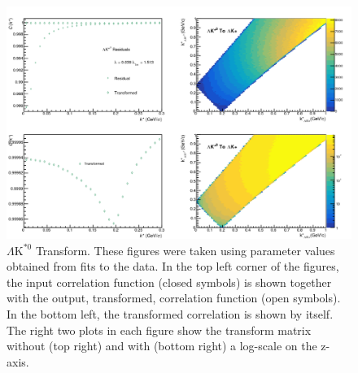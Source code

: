 \documentclass[../AnalysisNoteJBuxton.tex]{subfiles}
\begin{document}
\begin{figure}[h]
  \centering
  \includegraphics[width=\textwidth]{5_Fitting/Figures/Residuals_LamKchP_0010_LamKSt0_MomResCrctn_NonFlatBgdCrctn_10Res_PrimMaxDecay4fm_UsingXiDataAndCoulombOnly.pdf}
  \caption[$\Lambda\mathrm{K^{*0}}$ Transform]{$\Lambda\mathrm{K^{*0}}$ Transform.  These figures were taken using parameter values obtained from fits to the data.  In the top left corner of the figures, the input correlation function (closed symbols) is shown together with the output, transformed, correlation function (open symbols).  In the bottom left, the transformed correlation is shown by itself.  The right two plots in each figure show the transform matrix without (top right) and with (bottom right) a log-scale on the z-axis.}
  \label{fig:LamKSt0toLamKchPTransform}
\end{figure}

\clearpage
\end{document}

